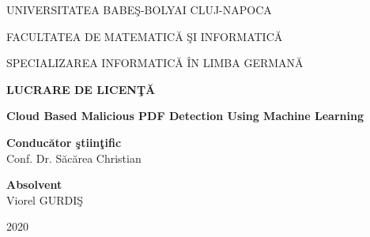 \documentclass[a4paper,12pt,twoside]{report}
\begin{document}
\begin{titlepage}
	\sloppy
	\begin{center}
		UNIVERSITATEA BABE\c S-BOLYAI CLUJ-NAPOCA

		FACULTATEA DE MATEMATIC\u A \c SI INFORMATIC\u A 

		SPECIALIZAREA INFORMATIC\u A \^ IN LIMBA GERMAN\u A

		\vspace{6cm}

		\Huge \textbf{LUCRARE DE LICEN\c T\u A}

		\vspace{0.5cm}

		\Huge \textbf{Cloud Based Malicious PDF Detection Using Machine Learning}

	\end{center}

	\vspace{3cm}

	\begin{flushleft}
		\Large{\textbf{Conduc\u ator \c stiin\c tific}}\\
		Conf. Dr. S\u{a}c\u{a}rea Christian
	\end{flushleft}

	\begin{flushright}
		\Large{\textbf{Absolvent}}\\
		Viorel GURDI\c S
	\end{flushright}

	\vspace{3cm}

	\begin{center}
		2020
	\end{center}
\end{titlepage}
\end{document}
